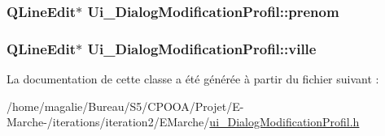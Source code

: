 \hypertarget{class_ui___dialog_modification_profil_a34af0438ab4d51c5a1cbd3171ca56fbf}{
\subsubsection[{prenom}]{\setlength{\rightskip}{0pt plus 5cm}Q\-Line\-Edit$\ast$ Ui\-\_\-\-Dialog\-Modification\-Profil\-::prenom}}\label{class_ui___dialog_modification_profil_a34af0438ab4d51c5a1cbd3171ca56fbf}
\hypertarget{class_ui___dialog_modification_profil_a1c6d48ece9604745e80462ef426ac0ea}{
\subsubsection[{ville}]{\setlength{\rightskip}{0pt plus 5cm}Q\-Line\-Edit$\ast$ Ui\-\_\-\-Dialog\-Modification\-Profil\-::ville}}\label{class_ui___dialog_modification_profil_a1c6d48ece9604745e80462ef426ac0ea}


La documentation de cette classe a été générée à partir du fichier suivant \-:\begin{DoxyCompactItemize}
\item 
/home/magalie/\-Bureau/\-S5/\-C\-P\-O\-O\-A/\-Projet/\-E-\/\-Marche-\//iterations/iteration2/\-E\-Marche/\hyperlink{ui___dialog_modification_profil_8h}{ui\-\_\-\-Dialog\-Modification\-Profil.\-h}\end{DoxyCompactItemize}

